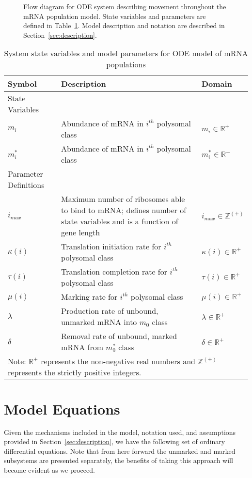 \documentclass[review]{elsarticle}
\begin{document}
\begin{figure} [htbp]
\begin{framed}
\begin{tikzpicture}[every node/.style={rectangle,fill=white,node distance=16ex, scale=0.75}, scale=0.90]
	\end{tikzpicture}
	\caption{Flow diagram for ODE system describing movement throughout the mRNA population model.
State variables and parameters are defined in Table~\ref{tab:params}.
Model description and notation are described in Section~\ref{sec:description}.}
	\label{fig:flow_diagram}
	\end{framed}
\end{figure}

\begin{table}
\centering
\begin{tabular}{|p{100pt} p{250pt} p{100pt}|}\hline
\textbf{Symbol}&\textbf{Description}&\textbf{Domain}\\ \hline\hline
State Variables & &\\ \hline
$m_i$ & Abundance of mRNA in $i^{th}$ polysomal class & $m_i\in\mathbb{R}^+$\\
$m_i^*$ & Abundance of mRNA in $i^{th}$ polysomal class & $m_i^*\in\mathbb{R}^+$\\ \hline
Parameter Definitions & &\\ \hline
$i_{max}$ & Maximum number of ribosomes able to bind to mRNA; defines number of state variables and is a function of gene length & $i_{max}\in\mathbb{Z}^{(+)}$\\
$\kappa(i)$ & Translation initiation rate for $i^{th}$ polysomal class &$\kappa(i)\in\mathbb{R}^+$\\
$\tau(i)$ & Translation completion rate for $i^{th}$ polysomal class &$\tau(i)\in\mathbb{R}^+$\\
$\mu(i)$ & Marking rate for $i^{th}$ polysomal class&$\mu(i)\in\mathbb{R}^+$\\
$\lambda$ & Production rate of unbound, unmarked mRNA into $m_0$ class&$\lambda\in\mathbb{R}^+$\\
$\delta$ & Removal rate of unbound, marked mRNA from $m_0^*$ class&$\delta\in\mathbb{R}^+$\\ \hline \hline
\multicolumn{3}{|p{450pt}|}{\footnotesize Note: $\mathbb{R}^+$ represents the non-negative real numbers and $\mathbb{Z}^{(+)}$ represents the strictly positive integers.} \\ \hline
\end{tabular}
\caption{System state variables and model parameters for ODE model of mRNA populations}
\label{tab:params}
\end{table}

\section{Model Equations}
Given the mechanisms included in the model, notation used, and assumptions provided in Section~\ref{sec:description}, we have the following set of ordinary differential equations.
Note that from here forward the unmarked and marked subsystems are presented separately, the benefits of taking this approach will become evident as we proceed.  
\end{document}
